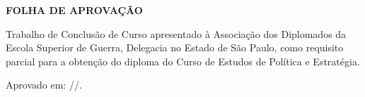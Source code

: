 \documentclass[
	12pt,				%
	openright,			%
	oneside,			%
	a4paper,			%
	chapter=TITLE,		%
	section=TITLE,		%
	english,			%
	french,				%
	spanish,			%
	brazil,				%
 ]{abntex2}
\begin{document}
\begin{folhadeaprovacao}
\begin{center}
\textbf{FOLHA DE APROVAÇÃO}
\end{center}

\noindent
Trabalho de Conclusão de Curso apresentado à Associação dos Diplomados da
Escola Superior de Guerra, Delegacia no Estado de São Paulo, como requisito
parcial para a obtenção do diploma do Curso de Estudos de Política e Estratégia.

\vspace{1cm}

\noindent
Aprovado em: \underline{\hspace{1.5cm}}/\underline{\hspace{1.5cm}}/\underline{\hspace{2cm}}.

\vfill

\end{folhadeaprovacao}




\end{document}
